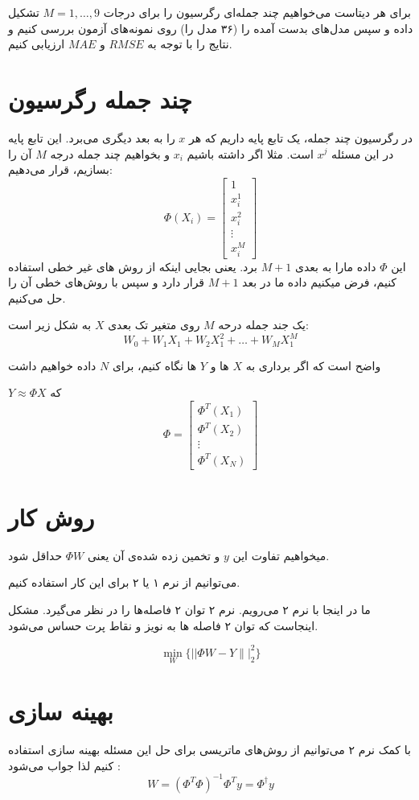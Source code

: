 \documentclass[a4paper, 12pt]{article}
\begin{document}
برای هر دیتاست می‌خواهیم چند جمله‌ای رگرسیون را برای درجات 
$M = 1,\dots,9$
تشکیل داده و سپس مدل‌های بدست آمده را (۳۶ مدل را) روی نمونه‌های آزمون بررسی کنیم و نتایج را با توجه به 
$RMSE$
و 
$MAE$
ارزیابی کنیم.

\section*{چند جمله رگرسیون}
در رگرسیون چند جمله، یک تابع پایه داریم که هر $x$ را به بعد دیگری می‌برد. این تابع پایه در این مسئله 
$x^j$
است.  مثلا اگر داشته باشیم 
$x_i$
و بخواهیم چند جمله درجه 
$M$
آن را بسازیم،
 قرار می‌دهیم:
\[
\Phi(X_i) = 
\begin{bmatrix}
	1\\x_i^1\\x_i^2\\\vdots\\x_i^M
\end{bmatrix}
\]
این 
$\Phi$
داده مارا به بعدی 
$M+1$
برد. یعنی بجایی اینکه از روش های غیر خطی استفاده کنیم، فرض میکنیم داده ما در بعد 
$M+1$
قرار دارد و سپس با روش‌های خطی آن را حل می‌کنیم.

یک جند جمله درحه 
$M$
روی متغیر تک بعدی 
$X$
به شکل زیر است:
\[
W_0  + W_1X_1 + W_2X_1^2 + \dots + W_MX_1^M
\]

واضح است که اگر برداری به 
$X$
ها و 
$Y$
ها نگاه کنیم، برای 
$N$
داده خواهیم داشت 

$Y \approx \Phi X$
که 
\[
\Phi = 
\begin{bmatrix}
	\Phi^T(X_1)\\
	\Phi^T(X_2)\\
	\vdots\\
	\Phi^T(X_N)
\end{bmatrix}
\]

\section*{روش کار}
میخواهیم تفاوت این 
$y$
و 
تخمین زده شده‌ی آن یعنی 
$\Phi W$
حداقل شود. 

می‌توانیم از نرم ۱ یا ۲ برای این کار استفاده کنیم.

ما در اینجا با نرم ۲ می‌رویم. نرم ۲ توان ۲ فاصله‌ها را در نظر می‌گیرد. مشکل اینجاست که  توان ۲ فاصله ها به نویز و نقاط پرت حساس می‌شود. 

\[
\min_W\{||\Phi W - Y\||_2^2\}
\] 
\section*{بهینه سازی}
با کمک نرم ۲ می‌توانیم از روش‌های ماتریسی برای حل این مسئله بهینه سازی استفاده کنیم لذا جواب می‌شود :
\[
W = (\Phi^T\Phi)^{-1}\Phi^T y = \Phi^\dagger y
\]
\end{document}
